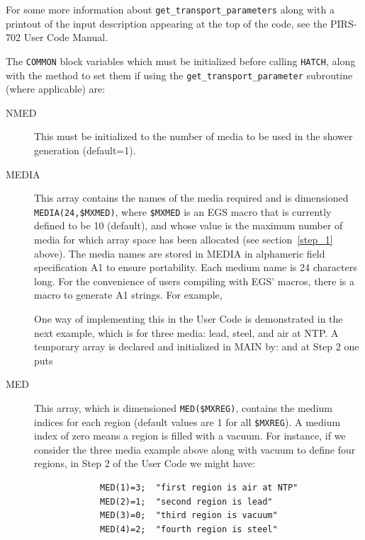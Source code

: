 For some more information about {\tt get\_transport\_parameters} along
with a printout of the input description appearing at the top of
the code, see the PIRS-702 User Code Manual\cite{Ro03}.

The {\tt COMMON} block variables which must be initialized before calling
{\tt HATCH}, along with the method to set them if using the
{\tt get\_transport\_parameter} subroutine (where applicable) are:
\begin{description}
\item[NMED]  This must be initialized to the number of media to be used in
the shower generation (default=1).


\item[MEDIA] This array contains the names of the media required and
is dimensioned\\{\tt MEDIA(24,\$MXMED)}, where {\tt \$MXMED} is an EGS
macro that is currently defined to be 10 (default), and whose value is
the maximum number of media for which array space has been allocated
(see section~\ref{step_1} above).  The media names are stored in MEDIA in
alphameric field specification A1 to ensure portability.  Each medium name
is 24 characters long.  For the convenience of users compiling with EGS'
macros, there is a macro to generate A1 strings.  For example, 
 

One way of implementing this in the User Code is demonstrated in the next
example, which is for three media: lead, steel, and air at NTP.  A
temporary array is declared and initialized in MAIN by:
and at Step 2 one puts

\item[MED] This array, which is dimensioned {\tt MED(\$MXREG)}, contains the
medium indices for each region (default values are 1 for all {\tt \$MXREG}).  A
medium index of zero means a region is filled with a vacuum. For instance,
if we consider the three media example above along with vacuum to define
four regions, in Step 2 of the User Code we might have:
\begin{verbatim}
             MED(1)=3;  "first region is air at NTP"
             MED(2)=1;  "second region is lead"
             MED(3)=0;  "third region is vacuum"
             MED(4)=2;  "fourth region is steel"
\end{verbatim}


\end{description}
